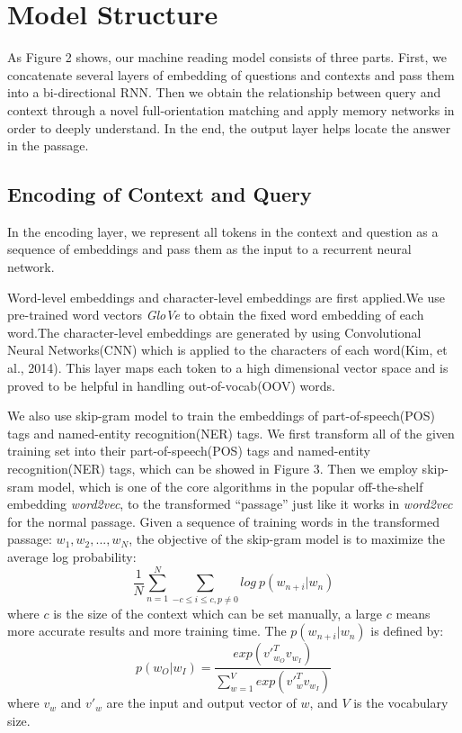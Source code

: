 \documentclass[letterpaper]{article}
\begin{document}
\section{Model Structure}
As Figure 2 shows, our machine reading model consists of three parts. First, we concatenate several layers of embedding of questions and contexts and pass them into a bi-directional RNN\citep{mikolov2010recurrent}. Then we obtain the relationship between query and context through a novel full-orientation matching and apply memory networks in order to deeply understand. In the end, the output layer helps locate the answer in the passage.
\subsection{Encoding of Context and Query}
In the encoding layer, we represent all tokens in the context and question as a sequence of embeddings and pass them as the input to a recurrent neural network. 

Word-level embeddings and character-level embeddings are first applied.We use pre-trained word vectors \emph{GloVe}\citep{pennington2014glove} to obtain the fixed word embedding of each word.The character-level embeddings are generated by using Convolutional Neural Networks(CNN) which is applied to the characters of each word(Kim, et al., 2014). This layer maps each token to a high dimensional vector space and is proved to be helpful in handling out-of-vocab(OOV) words.

We also use skip-gram model to train the embeddings of part-of-speech(POS) tags and named-entity recognition(NER) tags. We first transform all of the given training set into their part-of-speech(POS) tags and named-entity recognition(NER) tags, which can be showed in Figure 3. Then we employ skip-sram model, which is one of the core algorithms in the popular off-the-shelf embedding \emph{word2vec}\citep{mikolov2013distributed}, to the transformed ``passage'' just like it works in \emph{word2vec} for the normal passage. Given a sequence of training words in the transformed passage: $w_1, w_2, ..., w_N$, the objective of the skip-gram model is to maximize the average log probability:
$$\frac{1}{N} \sum_{n = 1}^{N} \sum_{-c \leq i \leq c, p \neq 0} log~p(w_{n+i}|w_n)$$
where $c$ is the size of the context which can be set manually, a large $c$ means more accurate results and more training time. The $p(w_{n+i}|w_n)$ is defined by:
$$p(w_O|w_I) = \frac{exp({v'}_{w_O}^{T} v_{w_I})}{\sum_{w = 1}^{V} exp({v'}_{w}^{T} v_{w_I})}$$
where $v_w$ and ${v'}_{w}$ are the input and output vector of $w$, and $V$ is the vocabulary size. 
\end{document}
